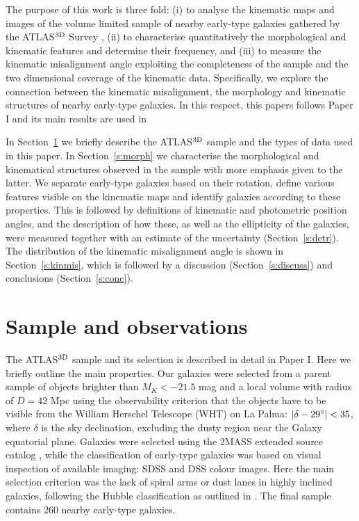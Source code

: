 \documentclass[usenatbib,usegraphicx]{mn2e}
\begin{document}
The purpose of this work is three fold: (i) to analyse the kinematic maps and images of the volume limited sample of nearby early-type galaxies gathered by the ATLAS$^{\rm 3D}$ Survey \citep[][hereafter Paper I]{2011Cappellari}, (ii) to characterise quantitatively the morphological and kinematic features and determine their frequency, and (iii) to measure the kinematic misalignment angle exploiting the completeness of the sample and the two dimensional coverage of the kinematic data. Specifically, we explore the connection between the kinematic misalignment, the morphology and kinematic structures of nearby early-type galaxies. In this respect, this papers follows Paper I and its main results are used in \citep[][hereafter Paper III]{2011Emsellem} 

In Section~\ref{s:samp} we briefly describe the ATLAS$^{\rm 3D}$ sample and the types of data used in this paper. In Section~\ref{s:morph} we characterise the morphological and kinematical structures observed in the sample with more emphasis given to the latter. We separate early-type galaxies based on their rotation, define various features visible on the kinematic maps and identify galaxies according to these properties. This is followed by definitions of kinematic and photometric position angles, and the description of how these, as well as the ellipticity of the galaxies, were measured together with an estimate of the uncertainty (Section~\ref{s:detr}). The distribution of the kinematic misalignment angle is shown in Section~\ref{s:kinmis}, which is followed by a discussion (Section~\ref{s:discuss}) and conclusions  (Section~\ref{s:conc}).


%
%

\section{Sample and observations}
\label{s:samp}

The ATLAS$^{\rm 3D}$ sample and its selection is described in detail in Paper I. Here we briefly outline the main properties. Our galaxies were selected from a parent sample of objects brighter than $M_K < -21.5$ mag and a local volume with radius of $D = 42$ Mpc using the observability criterion that the objects have to be visible from the William Herschel Telescope (WHT) on La Palma: $|\delta - 29\hbox{$^\circ$}| < 35 $, where $\delta$ is the sky declination, excluding the dusty region near the Galaxy equatorial plane. Galaxies were selected using the 2MASS extended source catalog \citep{2000AJ....119.2498J}, while the classification of  early-type galaxies was based on visual inspection of available imaging: SDSS and DSS colour images. Here the main selection criterion was the lack of spiral arms or dust lanes in highly inclined galaxies, following the Hubble classification \citep{1936RNeb..........H,1991trcb.book.....D} as outlined in \citet{1961hag..book.....S}.  The final sample contains 260 nearby early-type galaxies. 
\end{document}

